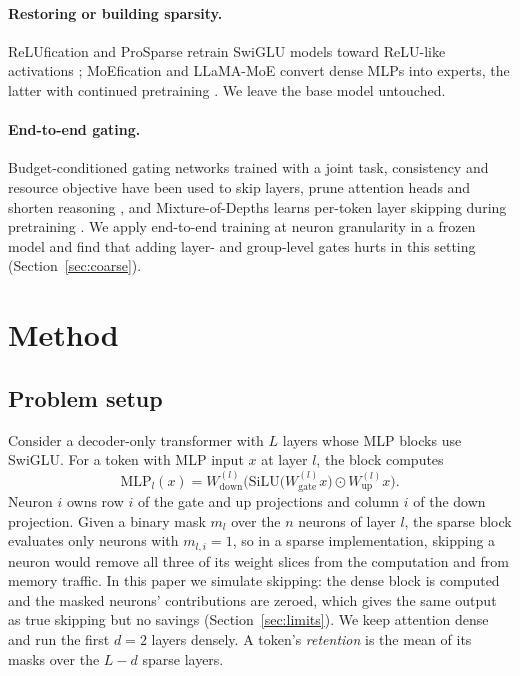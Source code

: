 \documentclass[10pt,twocolumn,letterpaper]{article}
\begin{document}
\paragraph{Restoring or building sparsity.} ReLUfication and ProSparse retrain SwiGLU models toward ReLU-like activations \citep{mirzadeh2023relu,song2025prosparse}; MoEfication and LLaMA-MoE convert dense MLPs into experts, the latter with continued pretraining \citep{zhang2022moefication,zhu2024llamamoe}. We leave the base model untouched.

\paragraph{End-to-end gating.} Budget-conditioned gating networks trained with a joint task, consistency and resource objective have been used to skip layers, prune attention heads and shorten reasoning \citep{chen2026e2e}, and Mixture-of-Depths learns per-token layer skipping during pretraining \citep{raposo2024mod}. We apply end-to-end training at neuron granularity in a frozen model and find that adding layer- and group-level gates hurts in this setting (Section~\ref{sec:coarse}).

\section{Method}

\subsection{Problem setup}

Consider a decoder-only transformer with $L$ layers whose MLP blocks use SwiGLU. For a token with MLP input $x$ at layer $l$, the block computes
\begin{equation}
\mathrm{MLP}_l(x) = W^{(l)}_{\mathrm{down}}\Big(\mathrm{SiLU}\big(W^{(l)}_{\mathrm{gate}}x\big) \odot W^{(l)}_{\mathrm{up}}x\Big).
\end{equation}
Neuron $i$ owns row $i$ of the gate and up projections and column $i$ of the down projection. Given a binary mask $m_l$ over the $n$ neurons of layer $l$, the sparse block evaluates only neurons with $m_{l,i}=1$, so in a sparse implementation, skipping a neuron would remove all three of its weight slices from the computation and from memory traffic. In this paper we simulate skipping: the dense block is computed and the masked neurons' contributions are zeroed, which gives the same output as true skipping but no savings (Section~\ref{sec:limits}). We keep attention dense and run the first $d=2$ layers densely. A token's \emph{retention} is the mean of its masks over the $L-d$ sparse layers.
\end{document}
